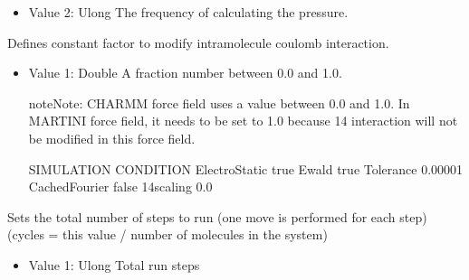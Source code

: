 \documentclass[letterpaper,10pt,english]{sphinxmanual}
\begin{document}
\begin{description}
\begin{itemize}
\item {} 
Value 2: Ulong \sphinxhyphen{} The frequency of calculating the pressure.

\end{itemize}

\item[{\sphinxcode{\sphinxupquote{1\sphinxhyphen{}4scaling}}}] \leavevmode
Defines constant factor to modify intra\sphinxhyphen{}molecule coulomb interaction.
\begin{itemize}
\item {} 
Value 1: Double \sphinxhyphen{} A fraction number between 0.0 and 1.0.

\begin{sphinxadmonition}{note}{Note:}
CHARMM force field uses a value between 0.0 and 1.0. In MARTINI force field, it needs to be set to 1.0 because 1\sphinxhyphen{}4 interaction will not be modified in this force field.
\end{sphinxadmonition}

\begin{sphinxVerbatim}[commandchars=\\\{\}]
\PYGZsh{}\PYGZsh{}\PYGZsh{}\PYGZsh{}\PYGZsh{}\PYGZsh{}\PYGZsh{}\PYGZsh{}\PYGZsh{}\PYGZsh{}\PYGZsh{}\PYGZsh{}\PYGZsh{}\PYGZsh{}\PYGZsh{}\PYGZsh{}\PYGZsh{}\PYGZsh{}\PYGZsh{}\PYGZsh{}\PYGZsh{}\PYGZsh{}\PYGZsh{}\PYGZsh{}\PYGZsh{}\PYGZsh{}\PYGZsh{}\PYGZsh{}\PYGZsh{}\PYGZsh{}\PYGZsh{}\PYGZsh{}\PYGZsh{}
\PYGZsh{} SIMULATION CONDITION
\PYGZsh{}\PYGZsh{}\PYGZsh{}\PYGZsh{}\PYGZsh{}\PYGZsh{}\PYGZsh{}\PYGZsh{}\PYGZsh{}\PYGZsh{}\PYGZsh{}\PYGZsh{}\PYGZsh{}\PYGZsh{}\PYGZsh{}\PYGZsh{}\PYGZsh{}\PYGZsh{}\PYGZsh{}\PYGZsh{}\PYGZsh{}\PYGZsh{}\PYGZsh{}\PYGZsh{}\PYGZsh{}\PYGZsh{}\PYGZsh{}\PYGZsh{}\PYGZsh{}\PYGZsh{}\PYGZsh{}\PYGZsh{}\PYGZsh{}
ElectroStatic   true
Ewald           true
Tolerance       0.00001
CachedFourier   false
1\PYGZhy{}4scaling      0.0
\end{sphinxVerbatim}

\end{itemize}

\item[{\sphinxcode{\sphinxupquote{RunSteps}}}] \leavevmode
Sets the total number of steps to run (one move is performed for each step) (cycles = this value / number of molecules in the system)
\begin{itemize}
\item {} 
Value 1: Ulong \sphinxhyphen{} Total run steps

\end{itemize}


\end{description}
\end{document}
